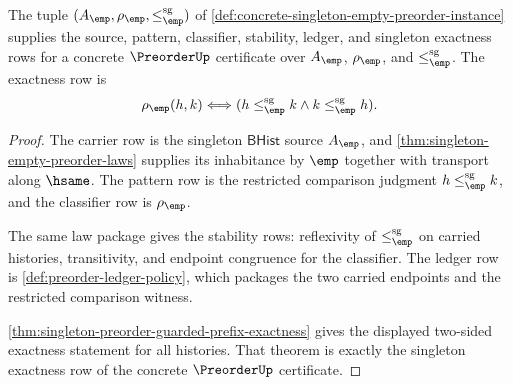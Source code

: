 \begin{theorem}
\label{thm:singleton-empty-preorder-namecert}
The tuple $(A_{\emp},\rho_{\emp},\le_{\emp}^{\mathrm{sg}})$ of
\autoref{def:concrete-singleton-empty-preorder-instance} supplies the source,
pattern, classifier, stability, ledger, and singleton exactness rows for a
concrete $\PreorderUp$ certificate over $A_{\emp}$, $\rho_{\emp}$, and
$\le_{\emp}^{\mathrm{sg}}$. The exactness row is
$$
\rho_{\emp}(h,k)\Longleftrightarrow
(h\le_{\emp}^{\mathrm{sg}}k\land k\le_{\emp}^{\mathrm{sg}}h).
$$
\end{theorem}
\begin{proof}
The carrier row is the singleton $\mathsf{BHist}$ source $A_{\emp}$, and
\autoref{thm:singleton-empty-preorder-laws} supplies its inhabitance by $\emp$
together with transport along $\hsame$. The pattern row is the restricted
comparison judgment $h\le_{\emp}^{\mathrm{sg}}k$, and the classifier row is
$\rho_{\emp}$.

The same law package gives the stability rows: reflexivity of
$\le_{\emp}^{\mathrm{sg}}$ on carried histories, transitivity, and endpoint
congruence for the classifier. The ledger row is
\autoref{def:preorder-ledger-policy}, which packages the two carried endpoints
and the restricted comparison witness.

\autoref{thm:singleton-preorder-guarded-prefix-exactness} gives the displayed
two-sided exactness statement for all histories. That theorem is exactly the
singleton exactness row of the concrete $\PreorderUp$ certificate.
\end{proof}

